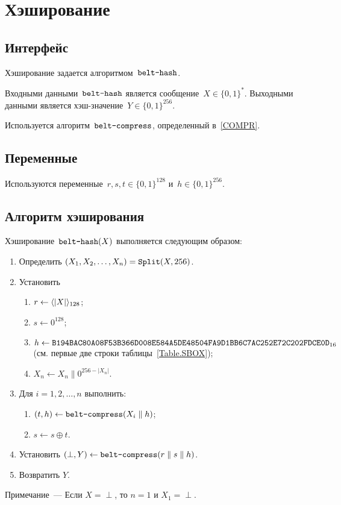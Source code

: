 \section{Хэширование}\label{HASH}

\subsection{Интерфейс}\label{HASH.IFace}

Хэширование задается алгоритмом~$\texttt{belt-hash}$.

Входными данными~$\texttt{belt-hash}$ является сообщение~$X\in\{0,1\}^*$.
%
Выходными данными является хэш-значение~$Y\in\{0,1\}^{256}$.

Используется алгоритм~$\texttt{belt-compress}$, определенный в~\ref{COMPR}.

\subsection{Переменные}\label{HASH.Vars}

Используются переменные~$r,s,t\in\{0,1\}^{128}$ и~$h\in\{0,1\}^{256}$.

\subsection{Алгоритм хэширования}\label{HASH.Alg}

Хэширование~$\texttt{belt-hash}(X)$ выполняется следующим образом:
\begin{enumerate}
\item
Определить $(X_1,X_2,\ldots,X_n)=\mathop{\texttt{Split}}\nolimits(X, 256)$.

\item
Установить
\begin{enumerate}
\item
$r\leftarrow \langle|X|\rangle_{128}$;
\item
$s\leftarrow 0^{128}$;
\item
$h\leftarrow\texttt{B194BAC80A08F53B366D008E584A5DE48504FA9D1BB6C7AC252E72C202FDCE0D}_{16}$ 
(см. первые две строки таблицы~\ref{Table.SBOX});
\item
$X_n\leftarrow X_n \parallel 0^{256-|X_n|}$.
\end{enumerate}

\item
Для $i=1,2,\ldots,n$ выполнить:
\begin{enumerate}
\item
$(t,h)\leftarrow\texttt{belt-compress}(X_i\parallel h)$;
\item
$s\leftarrow s\oplus t$.
\end{enumerate}

\item
Установить 
$(\perp,Y)\leftarrow\texttt{belt-compress}(r\parallel s\parallel h)$.

\item
Возвратить $Y$.
\end{enumerate}

\vskip9pt
\begin{note}
Примечание~--- Если $X=\perp$, то $n=1$ и $X_1=\perp$.
\end{note}

